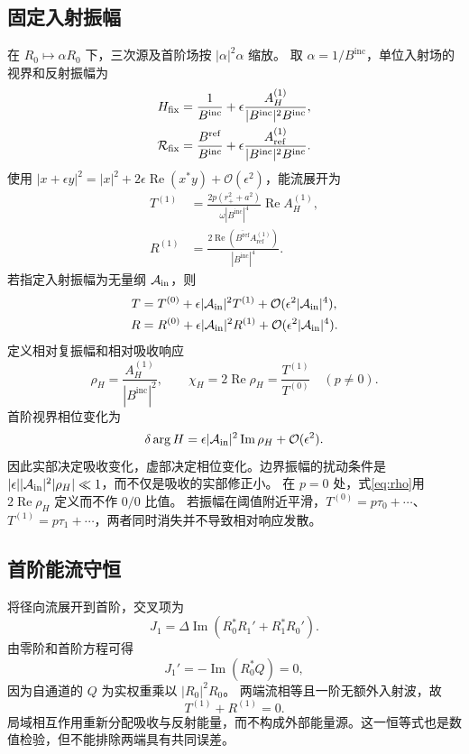 \documentclass[UTF8,fontset=fandol,11pt,a4paper]{ctexart}
\newcommand{\Rea}{\operatorname{Re}}
\newcommand{\Ima}{\operatorname{Im}}
\newcommand{\Bin}{B^{\mathrm{inc}}}
\newcommand{\Bref}{B^{\mathrm{ref}}}
\newcommand{\AH}{A_H^{(1)}}
\newcommand{\Aref}{A_{\mathrm{ref}}^{(1)}}
\newcommand{\calO}{\mathcal O}
\numberwithin{equation}{section}
\begin{document}
\subsection{固定入射振幅}
在 $R_0\mapsto\alpha R_0$ 下，三次源及首阶场按 $|\alpha|^2\alpha$ 缩放。
取 $\alpha=1/\Bin$，单位入射场的视界和反射振幅为
\begin{align}
H_{\rm fix}&=\frac1{\Bin}+\epsilon\frac{\AH}{|\Bin|^2\Bin},\\
\mathcal R_{\rm fix}&=\frac{\Bref}{\Bin}+\epsilon\frac{\Aref}{|\Bin|^2\Bin}.
\end{align}
使用 $|x+\epsilon y|^2=|x|^2+2\epsilon\Rea(x^*y)+\calO(\epsilon^2)$，能流展开为
\begin{align}
T^{(1)}&=\frac{2p(r_+^2+a^2)}{\omega|\Bin|^4}\Rea\AH,\label{eq:T1}\\
R^{(1)}&=\frac{2\Rea(\overline{\Bref}\Aref)}{|\Bin|^4}.\label{eq:Ref1}
\end{align}
若指定入射振幅为无量纲 $\mathcal A_{\rm in}$，则
\begin{align}
T&=T^{(0)}+\epsilon|\mathcal A_{\rm in}|^2T^{(1)}+\calO(\epsilon^2|\mathcal A_{\rm in}|^4),\\
R&=R^{(0)}+\epsilon|\mathcal A_{\rm in}|^2R^{(1)}+\calO(\epsilon^2|\mathcal A_{\rm in}|^4).
\end{align}
定义相对复振幅和相对吸收响应
\begin{equation}
\rho_H=\frac{\AH}{|\Bin|^2},\qquad
\chi_H=2\Rea\rho_H=\frac{T^{(1)}}{T^{(0)}}\quad(p\ne0).\label{eq:rho}
\end{equation}
首阶视界相位变化为
\begin{equation}\delta\arg H=\epsilon|\mathcal A_{\rm in}|^2\Ima\rho_H+\calO(\epsilon^2).\end{equation}
因此实部决定吸收变化，虚部决定相位变化。边界振幅的扰动条件是
$|\epsilon||\mathcal A_{\rm in}|^2|\rho_H|\ll1$，而不仅是吸收的实部修正小。
在 $p=0$ 处，式\eqref{eq:rho}用 $2\Rea\rho_H$ 定义而不作 $0/0$ 比值。
若振幅在阈值附近平滑，$T^{(0)}=p\tau_0+\cdots$、$T^{(1)}=p\tau_1+\cdots$，两者同时消失并不导致相对响应发散。

\subsection{首阶能流守恒}
将径向流展开到首阶，交叉项为
\begin{equation}
J_1=\Delta\Ima(R_0^*R_1'+R_1^*R_0').
\end{equation}
由零阶和首阶方程可得
\begin{equation}J_1'=-\Ima(R_0^*Q)=0,\end{equation}
因为自通道的 $Q$ 为实权重乘以 $|R_0|^2R_0$。
两端流相等且一阶无额外入射波，故
\begin{equation}T^{(1)}+R^{(1)}=0.\label{eq:balance1}\end{equation}
局域相互作用重新分配吸收与反射能量，而不构成外部能量源。这一恒等式也是数值检验，但不能排除两端具有共同误差。
\end{document}
